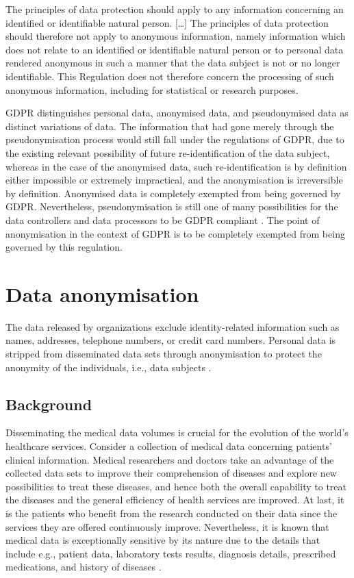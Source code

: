 \documentclass[a4paper,twoside,12pt]{book}
\begin{document}
\begin{displayquote}
	The principles of data protection should apply to any information concerning an identified or identifiable natural person. [\ldots] The principles of data protection should therefore not apply to anonymous information, namely information which does not relate to an identified or identifiable natural person or to personal data rendered anonymous in such a manner that the data subject is not or no longer identifiable. This Regulation does not therefore concern the processing of such anonymous information, including for statistical or research purposes.
\end{displayquote}

GDPR distinguishes personal data, anonymised data, and pseudonymised data as distinct variations of data. The information that had gone merely through the pseudonymisation process would still fall under the regulations of GDPR, due to the existing relevant possibility of future re-identification of the data subject, whereas in the case of the anonymised data, such re-identification is by definition either impossible or extremely impractical, and the anonymisation is irreversible by definition. Anonymised data is completely exempted from being governed by GDPR. Nevertheless, pseudonymisation is still one of many possibilities for the data controllers and data processors to be GDPR compliant \cite{bib:gdpr_practical_guide}. The point of anonymisation in the context of GDPR is to be completely exempted from being governed by this regulation.

\section{Data anonymisation}

The data released by organizations exclude identity-related information such as names, addresses, telephone numbers, or credit card numbers. Personal data is stripped from disseminated data sets through anonymisation to protect the anonymity of the individuals, i.e., data subjects \cite{bib:anonymization_extensive_study}.

\subsection{Background}
Disseminating the medical data volumes is crucial for the evolution of the world's healthcare services. Consider a collection of medical data concerning patients' clinical information. Medical researchers and doctors take an advantage of the collected data sets to improve their comprehension of diseases and explore new possibilities to treat these diseases, and hence both the overall capability to treat the diseases and the general efficiency of health services are improved. At last, it is the patients who benefit from the research conducted on their data since the services they are offered continuously improve. Nevertheless, it is known that medical data is exceptionally sensitive by its nature due to the details that include e.g., patient data, laboratory tests results, diagnosis details, prescribed medications, and history of diseases \cite{bib:anonymization_emr}.
\end{document}
